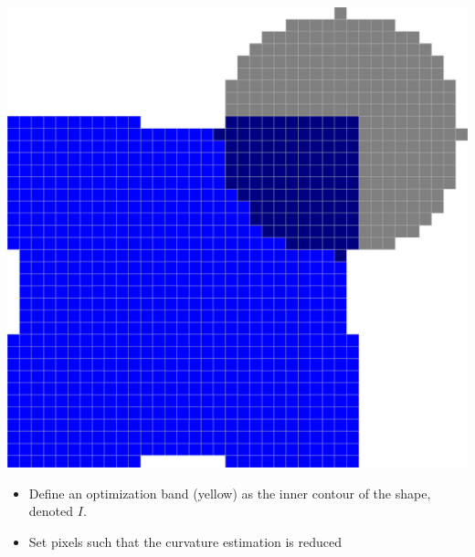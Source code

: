 \begin{frame}
\begin{minipage}[t][0.5\textheight]{1\textwidth}
{\includegraphics[scale=0.1]{figures/non-submodular-elastica/shape-opt-ball-after.png}}
\end{minipage}

\begin{itemize}
\item{Define an optimization band (yellow) as the inner contour of the shape, denoted $I$.}
\item{Set pixels such that the curvature estimation is reduced}
\end{itemize}
\end{frame}

